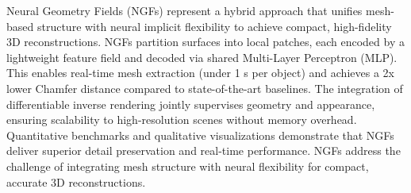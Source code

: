 Neural Geometry Fields (NGFs) represent a hybrid approach that unifies mesh-based structure with neural implicit flexibility to achieve compact, high-fidelity 3D reconstructions.  
NGFs partition surfaces into local patches, each encoded by a lightweight feature field and decoded via shared Multi-Layer Perceptron (MLP).  
This enables real-time mesh extraction (under 1 s per object) and achieves a 2x lower Chamfer distance compared to state-of-the-art baselines.  
The integration of differentiable inverse rendering jointly supervises geometry and appearance, ensuring scalability to high-resolution scenes without memory overhead.  
Quantitative benchmarks and qualitative visualizations demonstrate that NGFs deliver superior detail preservation and real-time performance.  
NGFs address the challenge of integrating mesh structure with neural flexibility for compact, accurate 3D reconstructions.